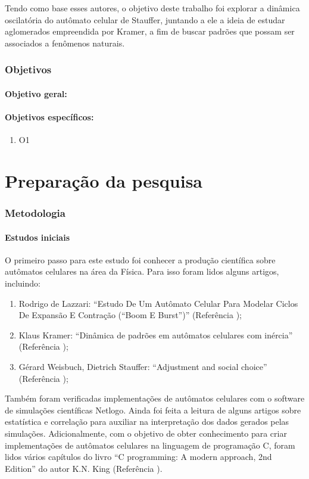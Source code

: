 \documentclass[
	12pt,				%
	openright,			%
	twoside,			%
	a4paper,			%
	english,			%
	french,				%
	spanish,			%
	brazil				%
	]{abntex2}
\begin{document}
Tendo como base esses autores, o objetivo deste trabalho foi explorar a dinâmica oscilatória do autômato celular de Stauffer, juntando a ele a ideia de estudar aglomerados empreendida por Kramer, a fim de buscar padrões que possam ser associados a fenômenos naturais.

\section*{Objetivos}

\subsection*{Objetivo geral:}

\subsection*{Objetivos específicos:}
\begin{enumerate}
  \item O1
\end{enumerate}

\part{Preparação da pesquisa}

\section*{Metodologia}

\subsection*{Estudos iniciais}

O primeiro passo para este estudo foi conhecer a produção científica sobre autômatos celulares na área da Física. Para isso foram lidos alguns artigos, incluindo:
\begin{enumerate}
    \item Rodrigo de Lazzari: “Estudo De Um Autômato Celular Para Modelar Ciclos De Expansão E Contração (“Boom E Burst”)” (Referência \cite{lazzari});
    \item Klaus Kramer: “Dinâmica de padrões em autômatos celulares com inércia” (Referência \cite{klaus});
    \item Gérard Weisbuch, Dietrich Stauffer: “Adjustment and social choice” (Referência \cite{stauffer});
\end{enumerate}
Também foram verificadas implementações de autômatos celulares  com o software de simulações científicas Netlogo. Ainda foi feita a leitura de alguns artigos sobre estatística e correlação para auxiliar na interpretação dos dados gerados pelas simulações. Adicionalmente, com o objetivo de obter conhecimento para criar implementações de autômatos celulares na linguagem de programação C, foram  lidos vários capítulos do livro “C programming: A modern approach, 2nd Edition” do autor K.N. King (Referência \cite{king}).
    
\end{document}
